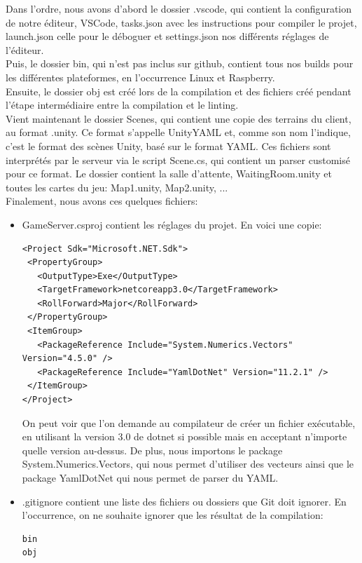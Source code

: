 \documentclass[a4paper]{article}
\begin{document}
Dans l’ordre, nous avons d’abord le dossier .vscode, qui contient la configuration de notre éditeur, VSCode, tasks.json avec les instructions pour compiler le projet, launch.json celle pour le déboguer et settings.json nos différents réglages de l'éditeur. \\
Puis, le dossier bin, qui n’est pas inclus sur github, contient tous nos builds pour les différentes plateformes, en l'occurrence Linux et Raspberry. \\
Ensuite, le dossier obj est créé lors de la compilation et des fichiers créé pendant l'étape intermédiaire entre la compilation et le linting. \\
Vient maintenant le dossier Scenes, qui contient une copie des terrains du client, au format .unity. Ce format s’appelle UnityYAML\cite{unityyaml} et, comme son nom l’indique, c’est le format des scènes Unity, basé sur le format YAML. Ces fichiers sont interprétés par le serveur via le script Scene.cs, qui contient un parser customisé pour ce format. Le dossier contient la salle d’attente, WaitingRoom.unity et toutes les cartes du jeu: Map1.unity, Map2.unity, ... \\
Finalement, nous avons ces quelques fichiers:
\begin{itemize}
    \item GameServer.csproj contient les réglages du projet. En voici une copie:
    \begin{verbatim}
<Project Sdk="Microsoft.NET.Sdk">
 <PropertyGroup>
   <OutputType>Exe</OutputType>
   <TargetFramework>netcoreapp3.0</TargetFramework>
   <RollForward>Major</RollForward>
 </PropertyGroup>
 <ItemGroup>
   <PackageReference Include="System.Numerics.Vectors" Version="4.5.0" />
   <PackageReference Include="YamlDotNet" Version="11.2.1" />
 </ItemGroup>
</Project>
    \end{verbatim}
    On peut voir que l’on demande au compilateur de créer un fichier exécutable, en utilisant la version 3.0 de dotnet si possible mais en acceptant n’importe quelle version au-dessus. De plus, nous importons le package System.Numerics.Vectors, qui nous permet d’utiliser des vecteurs ainsi que le package YamlDotNet\cite{yamldotnet} qui nous permet de parser du YAML.
    
    \item .gitignore contient une liste des fichiers ou dossiers que Git\cite{git} doit ignorer. En l'occurrence, on ne souhaite ignorer que les résultat de la compilation:
    \begin{verbatim}
bin
obj
    \end{verbatim}
\end{itemize}
\end{document}
